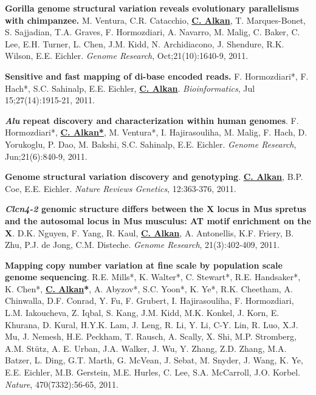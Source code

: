 \vspace{-.2cm}
{\bf Gorilla genome structural variation reveals evolutionary parallelisms with chimpanzee.}
M. Ventura, C.R. Catacchio, {\bf {\underline {C. Alkan}}}, T. Marques-Bonet, S. Sajjadian, T.A. Graves, F. Hormozdiari, A. Navarro, 
M. Malig, C. Baker, C. Lee, E.H. Turner, L. Chen, J.M. Kidd, N. Archidiacono, J. Shendure, R.K. Wilson, E.E. Eichler.
{\em Genome Research}, Oct;21(10):1640-9, 2011.


\vspace{-.2cm}
{\bf Sensitive and fast mapping of di-base encoded reads.}
F. Hormozdiari*, F. Hach*, S.C. Sahinalp, E.E. Eichler, {\bf {\underline {C. Alkan}}}.
{\em Bioinformatics}, Jul 15;27(14):1915-21, 2011.


        \clearpage


\vspace{-.2cm}
{\bf \textit {Alu} repeat discovery and characterization within human genomes}.
F. Hormozdiari*, {\bf {\underline {C. Alkan*}}}, M. Ventura*, I. Hajirasouliha, M. Malig, 
F. Hach, D. Yorukoglu, P. Dao, M. Bakshi, S.C. Sahinalp, E.E. Eichler.
{\em Genome Research}, Jun;21(6):840-9, 2011.

\vspace{-.2cm}
{\bf Genome structural variation discovery and genotyping}. 
{\bf {\underline {C. Alkan}}}, B.P. Coe, E.E. Eichler.
{\em Nature Reviews Genetics}, 12:363-376, 2011.


\vspace{-.2cm}
{\bf {\em Clcn4-2} genomic structure differs between the X locus in Mus spretus and the autosomal 
locus in Mus musculus: AT motif enrichment on the X}.  
D.K. Nguyen, F. Yang, R. Kaul, {\bf {\underline {C. Alkan}}}, A. Antonellis, K.F. Friery, 
B. Zhu, P.J. de Jong, C.M. Disteche. 
{\em Genome Research}, 21(3):402-409, 2011.


\vspace{-.2cm}
{\bf Mapping copy number variation at fine scale by population scale genome sequencing}.
R.E. Mills*, K. Walter*, C. Stewart*, R.E. Handsaker*, K. Chen*, 
{\bf {\underline {C. Alkan}*}}, A. Abyzov*, S.C. Yoon*, K. Ye*, R.K. Cheetham, 
A. Chinwalla, D.F. Conrad, Y. Fu, F. Grubert, I. Hajirasouliha, 
F. Hormozdiari, L.M. Iakoucheva, Z. Iqbal, S. Kang, J.M. Kidd, 
M.K. Konkel, J. Korn, E. Khurana, D. Kural, H.Y.K. Lam, J. Leng, 
R. Li, Y. Li, C-Y. Lin, R. Luo, X.J. Mu, J. Nemesh,
H.E. Peckham, T. Rausch, A. Scally, X. Shi, M.P. Stromberg, 
A.M. St\"{u}tz, A. E. Urban, J.A. Walker, J. Wu, Y. Zhang, 
Z.D. Zhang, M.A. Batzer, L. Ding, G.T. Marth, G. McVean, 
J. Sebat, M. Snyder, J. Wang, K. Ye, E.E. Eichler, 
M.B. Gerstein, M.E. Hurles, C. Lee, S.A. McCarroll,  J.O. Korbel.
{\em Nature}, 470(7332):56-65, 2011.


